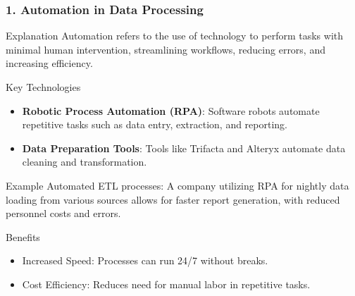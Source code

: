 \documentclass[aspectratio=169]{beamer}
\begin{document}
\begin{frame}[fragile]
    \frametitle{1. Automation in Data Processing}
    \begin{block}{Explanation}
    Automation refers to the use of technology to perform tasks with minimal human intervention, streamlining workflows, reducing errors, and increasing efficiency.
    \end{block}
    
    \begin{block}{Key Technologies}
    \begin{itemize}
        \item \textbf{Robotic Process Automation (RPA)}: Software robots automate repetitive tasks such as data entry, extraction, and reporting.
        \item \textbf{Data Preparation Tools}: Tools like Trifacta and Alteryx automate data cleaning and transformation.
    \end{itemize}
    \end{block}

    \begin{block}{Example}
    Automated ETL processes: A company utilizing RPA for nightly data loading from various sources allows for faster report generation, with reduced personnel costs and errors.
    \end{block}
    
    \begin{block}{Benefits}
    \begin{itemize}
        \item Increased Speed: Processes can run 24/7 without breaks.
        \item Cost Efficiency: Reduces need for manual labor in repetitive tasks.
    \end{itemize}
    \end{block}
\end{frame}
\end{document}

